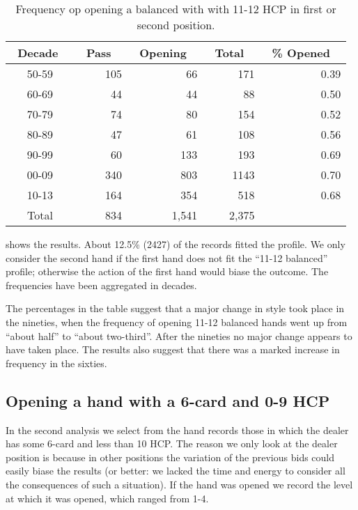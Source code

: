 \documentclass{llncs}
\begin{document}
\begin{table}
\caption{Frequency op opening a balanced with with 11-12 HCP in first
  or second position.}
\label{tbl:opening-11-12-bal-2}
\centering\footnotesize
\begin{tabular}{|c|r|r|r|r|}
\hline
\bf \ Decade \ & \bf \ Pass \ & \bf \ Opening \ & \bf \ Total \  & 
\bf \ \% Opened \ \\ \hline 
50-59 & 105 & 66 & 171 & 0.39\\
60-69 & 44 & 44 & 88 & 0.50\\
70-79 & 74 & 80 & 154 & 0.52\\
80-89 & 47 & 61 & 108 & 0.56\\
90-99 & 60 & 133 & 193 & 0.69\\
00-09 & 340 & 803 & 1143 & 0.70\\
10-13 & 164 & 354 & 518 & 0.68 \\ 
\hline
Total & 834 & 1,541 & 2,375 & \\ 
\hline
\end{tabular}
\end{table}

 shows the results. About 12.5\% (2427)
of the records fitted the profile. We only consider the second hand if
the first hand does not fit the ``11-12 balanced'' profile; otherwise
the action of the first hand would biase the outcome.  The frequencies
have been aggregated in decades.   

The percentages in the table suggest that a major change in style took
place in the 
nineties, when the frequency of opening 11-12 balanced hands went up
from ``about half''  to ``about two-third''. After the nineties no
major change appears to have taken place.  The results also suggest
that there was a marked increase in frequency in the sixties.  
 
\subsection{Opening a hand with a  6-card and 0-9 HCP}

In the second analysis we select from the hand records those in
which the dealer has some 6-card and less than 10 HCP. The reason we
only look at the dealer position is because in other positions the
variation of the previous bids could easily biase the results (or
better: we lacked the time and energy to consider all the
consequences of such a situation).  If the hand was opened we record
the level at which it was opened, which ranged from 1-4.  
\end{document}
